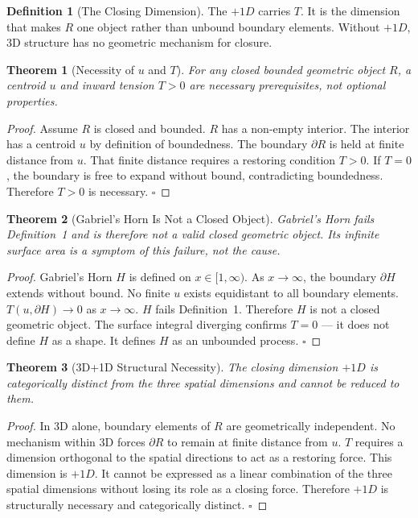 \documentclass[12pt,a4paper]{article}
\newtheorem{theorem}{Theorem}[section]
\theoremstyle{definition}
\newtheorem{definition}{Definition}[section]
\begin{document}
\begin{definition}[The Closing Dimension]
The $+1D$ carries $T$. It is the dimension that makes $R$ one object rather than unbound boundary elements. Without $+1D$, 3D structure has no geometric mechanism for closure.
\end{definition}

\begin{theorem}[Necessity of $u$ and $T$]\label{thm:I}
For any closed bounded geometric object $R$, a centroid $u$ and inward tension $T > 0$ are necessary prerequisites, not optional properties.
\end{theorem}
\begin{proof}
Assume $R$ is closed and bounded. $R$ has a non-empty interior. The interior has a centroid $u$ by definition of boundedness. The boundary $\partial R$ is held at finite distance from $u$. That finite distance requires a restoring condition $T > 0$. If $T = 0$, the boundary is free to expand without bound, contradicting boundedness. Therefore $T > 0$ is necessary. $\square$
\end{proof}

\begin{theorem}[Gabriel's Horn Is Not a Closed Object]\label{thm:II}
Gabriel's Horn fails Definition~1 and is therefore not a valid closed geometric object. Its infinite surface area is a symptom of this failure, not the cause.
\end{theorem}
\begin{proof}
Gabriel's Horn $H$ is defined on $x \in [1,\infty)$. As $x \to \infty$, the boundary $\partial H$ extends without bound. No finite $u$ exists equidistant to all boundary elements. $T(u, \partial H) \to 0$ as $x \to \infty$. $H$ fails Definition~1. Therefore $H$ is not a closed geometric object. The surface integral diverging confirms $T = 0$ --- it does not define $H$ as a shape. It defines $H$ as an unbounded process. $\square$
\end{proof}

\begin{theorem}[3D+1D Structural Necessity]\label{thm:III}
The closing dimension $+1D$ is categorically distinct from the three spatial dimensions and cannot be reduced to them.
\end{theorem}
\begin{proof}
In 3D alone, boundary elements of $R$ are geometrically independent. No mechanism within 3D forces $\partial R$ to remain at finite distance from $u$. $T$ requires a dimension orthogonal to the spatial directions to act as a restoring force. This dimension is $+1D$. It cannot be expressed as a linear combination of the three spatial dimensions without losing its role as a closing force. Therefore $+1D$ is structurally necessary and categorically distinct. $\square$
\end{proof}
\end{document}

